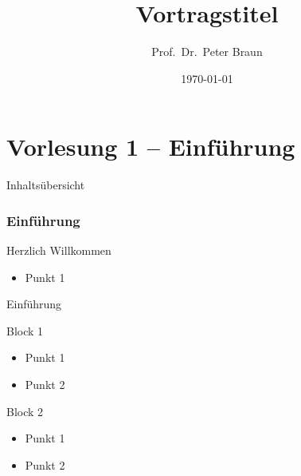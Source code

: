 \documentclass{beamer}
\title{Vortragstitel}
\author{Prof.\ Dr.\ Peter Braun}
\institute{Hochschule für angewandte Wissenschaften Würzburg-Schweinfurt}
\date{\today}
\begin{document}
\begin{frame}[plain]  
\titlepage
\end{frame}

\part{Vorlesung 1 -- Einführung}
 
\begin{frame}{Inhaltsübersicht}
\tableofcontents[hideallsubsections] 
\end{frame}
 
\section{Einführung}
 
\begin{frame}{Herzlich Willkommen}
\begin{itemize}
   \item Punkt 1
\end{itemize} 
\end{frame} 
 
 
\begin{frame}{Einführung}
\begin{block}{Block 1}
 \begin{itemize}
  \item Punkt 1
  \item Punkt 2
 \end{itemize}
\end{block}
\begin{block}{Block 2}
 \begin{itemize}
  \item Punkt 1
  \item Punkt 2
 \end{itemize}
\end{block}
\end{frame} 
\end{document}

